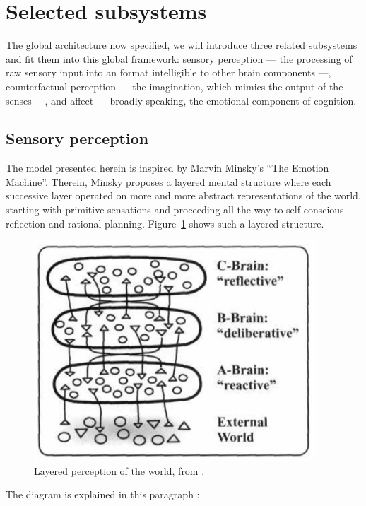 \documentclass[]{scrartcl}
\begin{document}
\section{Selected subsystems}\label{sec:selectedSubsystems}

The global architecture now specified, we will introduce three related subsystems and fit them into this global framework: sensory perception --- the processing of raw sensory input into an format intelligible to other brain components ---, counterfactual perception --- the imagination, which mimics the output of the senses ---, and affect --- broadly speaking, the emotional component of cognition.

\subsection{Sensory perception}

The model presented herein is inspired by Marvin Minsky's ``The Emotion Machine''. Therein, Minsky proposes a layered mental structure where each successive layer operated on more and more abstract representations of the world, starting with primitive sensations and proceeding all the way to self-conscious reflection and rational planning. Figure~\ref{fig:brainLayers} shows such a layered structure.

 \begin{figure}[!h]
 	\centering
 	\includegraphics[width=300pt]{figs/emotionMachine_brainLayers.png}
 	\caption{Layered perception of the world, from \cite[p. 100]{emotionMachine}.}
 	\label{fig:brainLayers}
 \end{figure}
 
The diagram is explained in this paragraph \cite[p. 100]{emotionMachine}:
\end{document}
